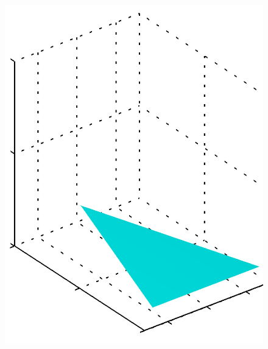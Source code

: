 \documentclass[b5paper]{book}
\numberwithin{equation}{chapter}
\begin{document}
{\begin{figure}[ht]
\begin{minipage}[t]{0.3\linewidth}
		\includegraphics[scale=0.8]{Images/2-5b.png}
		\label{fig:2-5b}
		\end{minipage}
		\begin{minipage}[t]{0.3\linewidth}
		\centering

\end{minipage}
\end{figure}}
\end{document}
